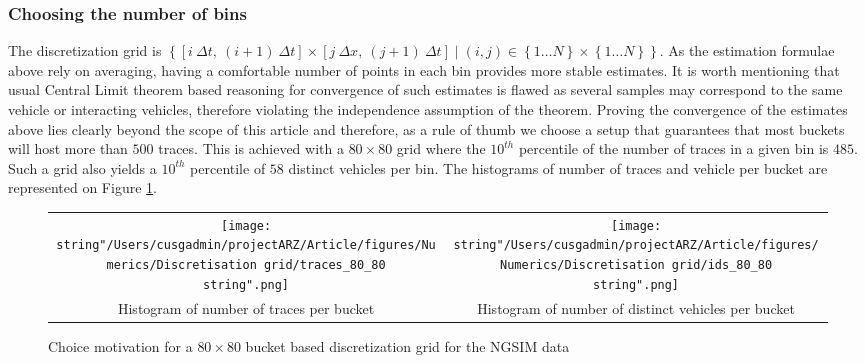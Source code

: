 \documentclass[preprint]{elsarticle}
\begin{document}
\subsubsection{Choosing the number of bins}

The discretization grid is $\left\{ \left[i\:\Delta t,\:\left(i+1\right)\:\Delta t\right]\times\left[j\:\Delta x,\:\left(j+1\right)\:\Delta t\right]\mid\left(i,j\right)\in\left\{ 1\ldots N\right\} \times\left\{ 1\ldots N\right\} \right\} $.
As the estimation formulae above rely on averaging, having a comfortable
number of points in each bin provides more stable estimates. It is
worth mentioning that usual Central Limit theorem based reasoning
for convergence of such estimates is flawed as several samples may
correspond to the same vehicle or interacting vehicles, therefore
violating the independence assumption of the theorem. Proving the
convergence of the estimates above lies clearly beyond the scope of
this article and therefore, as a rule of thumb we choose a setup that
guarantees that most buckets will host more than $500$ traces. This
is achieved with a $80\times80$ grid where the $10^{th}$ percentile
of the number of traces in a given bin is $485$. Such a grid also
yields a $10^{th}$ percentile of $58$ distinct vehicles per bin.
The histograms of number of traces and vehicle per bucket are represented
on Figure \ref{fig:Grid control}.

\begin{figure}
\begin{centering}
\begin{tabular}{cc}
\texttt{[image: \\string"/Users/cusgadmin/projectARZ/Article/figures/Numerics/Discretisation grid/traces\_80\_80\\string".png]} & \texttt{[image: \\string"/Users/cusgadmin/projectARZ/Article/figures/Numerics/Discretisation grid/ids\_80\_80\\string".png]}\tabularnewline
Histogram of number of traces per bucket & Histogram of number of distinct vehicles per bucket\tabularnewline
\end{tabular}
\par\end{centering}

\protect\caption{Choice motivation for a $80\times80$ bucket based discretization
grid for the NGSIM data\label{fig:Grid control}}


\end{figure}
\end{document}
